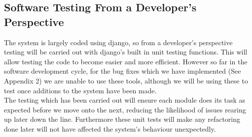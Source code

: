 \subsection*{Software Testing From a Developer’s Perspective}

The system is largely coded using django, so from a developer's perspective testing will be carried out with django’s built in unit testing functions. This will allow testing the code to become easier and more efficient. However so far in the software development cycle, for the bug fixes which we have implemented (See Appendix 2) we are unable to use these tools, although we will be using these to test once additions to the system have been made.\\

The testing which has been carried out will ensure each module does its task as expected before we move onto the next, reducing the likelihood of issues rearing up later down the line. Furthermore these unit tests will make any refactoring done later will not have affected the system's behaviour unexpectedly.\\